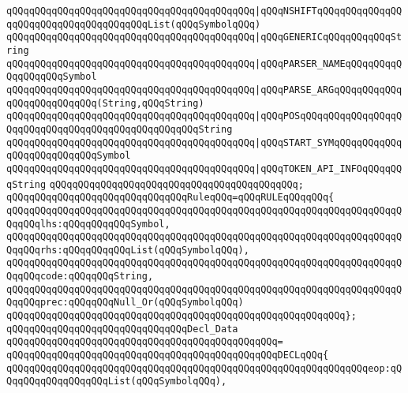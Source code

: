 \verb|qQQqqQQqqQQqqQQqqQQqqQQqqQQqqQQqqQQqqQQqqQQq|\verb#|qQQqNSHIFTqQQqqQQqqQQqqQQqqQQqqQQqqQQqqQQqqQQqqQQqList(qQQqSymbolqQQq)#\newline
\verb|qQQqqQQqqQQqqQQqqQQqqQQqqQQqqQQqqQQqqQQqqQQq|\verb#|qQQqGENERICqQQqqQQqqQQqString#\newline
\verb|qQQqqQQqqQQqqQQqqQQqqQQqqQQqqQQqqQQqqQQqqQQq|\verb#|qQQqPARSER_NAMEqQQqqQQqqQQqqQQqqQQqSymbol#\newline
\verb|qQQqqQQqqQQqqQQqqQQqqQQqqQQqqQQqqQQqqQQqqQQq|\verb#|qQQqPARSE_ARGqQQqqQQqqQQqqQQqqQQqqQQqqQQq(String,qQQqString)#\newline
\verb|qQQqqQQqqQQqqQQqqQQqqQQqqQQqqQQqqQQqqQQqqQQq|\verb#|qQQqPOSqQQqqQQqqQQqqQQqqQQqqQQqqQQqqQQqqQQqqQQqqQQqqQQqqQQqString#\newline
\verb|qQQqqQQqqQQqqQQqqQQqqQQqqQQqqQQqqQQqqQQqqQQq|\verb#|qQQqSTART_SYMqQQqqQQqqQQqqQQqqQQqqQQqqQQqSymbol#\newline
\verb|qQQqqQQqqQQqqQQqqQQqqQQqqQQqqQQqqQQqqQQqqQQq|\verb#|qQQqTOKEN_API_INFOqQQqqQQqString#\newline
\verb|qQQqqQQqqQQqqQQqqQQqqQQqqQQqqQQqqQQqqQQqqQQq;|\newline
\newline
\verb|qQQqqQQqqQQqqQQqqQQqqQQqqQQqqQQqRuleqQQq=qQQqRULEqQQqqQQq{|\newline
\verb|qQQqqQQqqQQqqQQqqQQqqQQqqQQqqQQqqQQqqQQqqQQqqQQqqQQqqQQqqQQqqQQqqQQqqQQqqQQqlhs:qQQqqQQqqQQqSymbol,|\newline
\verb|qQQqqQQqqQQqqQQqqQQqqQQqqQQqqQQqqQQqqQQqqQQqqQQqqQQqqQQqqQQqqQQqqQQqqQQqqQQqrhs:qQQqqQQqqQQqList(qQQqSymbolqQQq),|\newline
\verb|qQQqqQQqqQQqqQQqqQQqqQQqqQQqqQQqqQQqqQQqqQQqqQQqqQQqqQQqqQQqqQQqqQQqqQQqqQQqcode:qQQqqQQqString,|\newline
\verb|qQQqqQQqqQQqqQQqqQQqqQQqqQQqqQQqqQQqqQQqqQQqqQQqqQQqqQQqqQQqqQQqqQQqqQQqqQQqprec:qQQqqQQqNull_Or(qQQqSymbolqQQq)|\newline
\verb|qQQqqQQqqQQqqQQqqQQqqQQqqQQqqQQqqQQqqQQqqQQqqQQqqQQqqQQqqQQq};|\newline
\newline
\verb|qQQqqQQqqQQqqQQqqQQqqQQqqQQqqQQqDecl_Data|\newline
\verb|qQQqqQQqqQQqqQQqqQQqqQQqqQQqqQQqqQQqqQQqqQQqqQQq=|\newline
\verb|qQQqqQQqqQQqqQQqqQQqqQQqqQQqqQQqqQQqqQQqqQQqqQQqDECLqQQq{|\newline
\verb|qQQqqQQqqQQqqQQqqQQqqQQqqQQqqQQqqQQqqQQqqQQqqQQqqQQqqQQqqQQqqQQqeop:qQQqqQQqqQQqqQQqqQQqList(qQQqSymbolqQQq),|\newline
